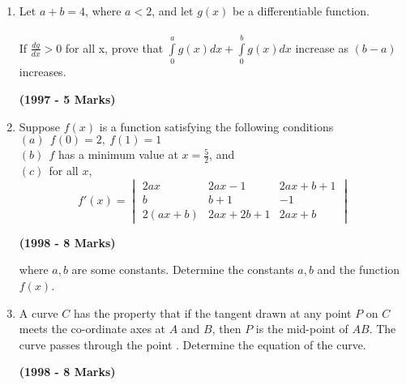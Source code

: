 \documentclass[journal,12pt,twocolumn]{IEEEtran}
\theoremstyle{remark}
\begin{document}
\begin{enumerate}
\item Let $a + b = 4$, where $a<2$, and let $g(x)$ be a differentiable function.\\\\
If $\frac{dg}{dx}>0$ for all x, prove that $\int\limits_0^a g(x) dx + \int\limits_0^b g(x) dx$ increase as $(b-a)$ increases.

\hfill{\textbf{(1997 - 5 Marks)}}


\item Suppose $f(x)$ is a function satisfying the following conditions\\
$(a) \ \ f(0) = 2,\ f(1) = 1$\\
$(b) \ \ f$ has a minimum value at $x = \frac{5}{2}$, and\\
$(c) \ \ $for all $x$,\\
$$f'(x)=
\begin{vmatrix}
2ax & 2ax-1 & 2ax+b+1\\
b & b+1 & -1\\
2(ax+b) & 2ax+2b+1 & 2ax+b
\end{vmatrix}$$

\hfill{\textbf{(1998 - 8 Marks)}}

where $a, b$ are some constants. Determine the constants $a, b$ and the function $f(x)$.

\item A curve $C$ has the property that if the tangent drawn at any point $P$ on $C$ meets the co-ordinate axes at $A$ and $B$, then $P$ is the mid-point of $AB$. The curve passes through the point . Determine the equation of the curve.

\hfill{\textbf{(1998 - 8 Marks)}}

 
\end{enumerate}
\end{document}
